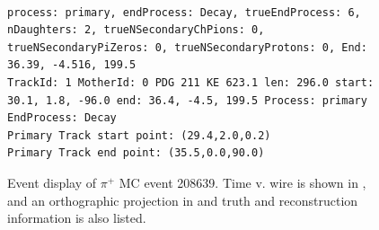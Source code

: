 \documentclass[letterpaper,12pt]{article}
\newcommand{\pip}{\ensuremath{\pi^{+}}}
\begin{document}
\begin{figure}[!hbtp]
\begin{center}
{    }
\\
\begin{lstlisting}
process: primary, endProcess: Decay, trueEndProcess: 6, nDaughters: 2, trueNSecondaryChPions: 0, trueNSecondaryPiZeros: 0, trueNSecondaryProtons: 0, End: 36.39, -4.516, 199.5
TrackId: 1 MotherId: 0 PDG 211 KE 623.1 len: 296.0 start: 30.1, 1.8, -96.0 end: 36.4, -4.5, 199.5 Process: primary EndProcess: Decay
Primary Track start point: (29.4,2.0,0.2)
Primary Track end point: (35.5,0.0,90.0)
\end{lstlisting}
    \caption{%
                Event display of \pip{} MC event 208639. 
                Time v. wire is shown in , 
                and an orthographic projection in 
                and truth and reconstruction information is also listed.
            }
    \label{fig:evd_pipMC_208639}
  \end{center}
\end{figure}
\end{document}
